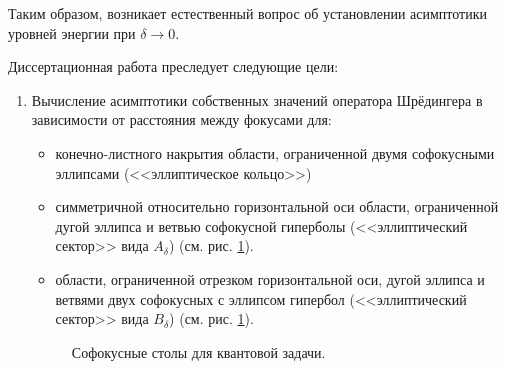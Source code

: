 Таким образом, возникает естественный вопрос об установлении асимптотики уровней энергии при $\delta \to 0$. 

{\aim} 
Диссертационная работа преследует следующие цели:
\begin{enumerate}[beginpenalty=10000] %
  \item Вычисление асимптотики собственных значений оператора Шрёдингера в зависимости от расстояния между фокусами для:
  \begin{itemize}[beginpenalty=10000] %
  \item конечно-листного накрытия области, ограниченной двумя софокусными эллипсами (<<эллиптическое кольцо>>)
  \item симметричной относительно горизонтальной оси области, ограниченной дугой эллипса и ветвью софокусной  гиперболы (<<эллиптический сектор>> вида $A_\delta$)  (см. рис. \ref{fig:intro_quantum_domains}).
  \item области, ограниченной отрезком горизонтальной оси, дугой эллипса и ветвями двух софокусных с эллипсом гипербол (<<эллиптический сектор>> вида $B_\delta$)  (см. рис. \ref{fig:intro_quantum_domains}).
  \end{itemize}
   \begin{figure}[ht]
    \caption{Софокусные столы для квантовой задачи.}\label{fig:intro_quantum_domains}
\end{figure}
  

\end{enumerate}
